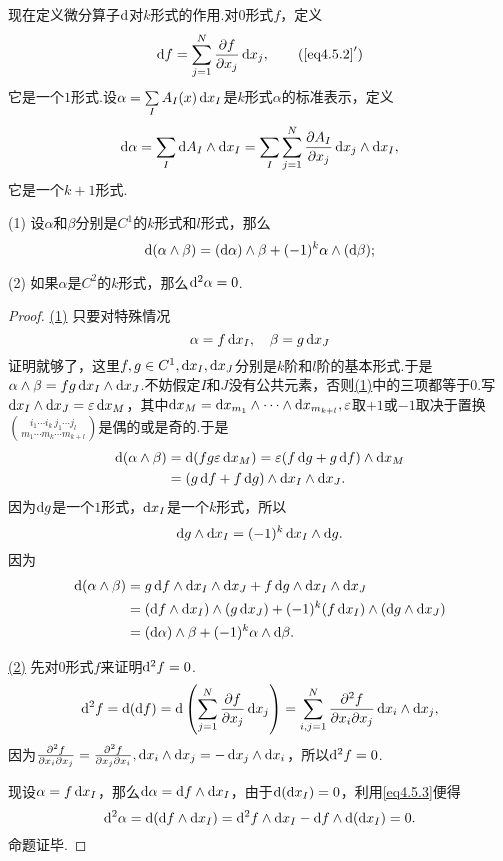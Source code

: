 现在定义微分算子$\mathop{}\!\mathrm{d}$对$k$形式的作用.对$0$形式$f$，定义
\begin{equation}\label{eq4.5.2'}
	\dif f=\sum_{j=1}^{N}\pp{f}{x_j}\dx_j,\tag{$\ref{eq4.5.2}'$}
\end{equation}
它是一个$1$形式.设$\alpha=\sum\limits_I A_I(x)\mathop{}\!\mathrm dx_I$是$k$形式$\alpha$的标准表示，定义
\[\mathop{}\!\mathrm{d}\alpha=\sum_I \mathop{}\!\mathrm{d} A_I\wedge\mathop{}\!\mathrm dx_I=\sum_I \sum_{j=1}^{N}\frac{\partial A_I}{\partial x_j}\mathop{}\!\mathrm dx_j\wedge\mathop{}\!\mathrm dx_I,\]
它是一个$k+1$形式.
\begin{prop}\label{prop4.5.1}
	(1)\hypertarget{4.5.1}{}
	设$\alpha$和$\beta$分别是$C^1$的$k$形式和$l$形式，那么
	\begin{equation}\label{eq4.5.3}
		\mathop{}\!\mathrm{d}(\alpha\wedge\beta)=(\mathop{}\!\mathrm{d}\alpha)\wedge\beta+(-1)^k\alpha\wedge(\mathop{}\!\mathrm{d}\beta);
	\end{equation}
	
	(2)\hypertarget{4.5.1}{}
	如果$\alpha$是$C^2$的$k$形式，那么$\mathop{}\!\mathrm{d}^2\alpha=0$.
\end{prop}
\begin{proof}
	\hyperlink{4.5.1}{(1)}
	只要对特殊情况
	\[\alpha=f\mathop{}\!\mathrm dx_I,\quad \beta=g\mathop{}\!\mathrm dx_J\]
	证明就够了，这里$f,g\in C^1,\mathop{}\!\mathrm dx_I,\mathop{}\!\mathrm dx_J$分别是$k$阶和$l$阶的基本形式.于是$\alpha\wedge\beta=fg\mathop{}\!\mathrm dx_I\wedge\mathop{}\!\mathrm dx_J$.不妨假定$I$和$J$没有公共元素，否则\hyperlink{4.5.1}{(1)}中的三项都等于$0$.写$\mathop{}\!\mathrm dx_I\wedge\mathop{}\!\mathrm dx_J=\varepsilon\mathop{}\!\mathrm dx_M$，其中$\mathop{}\!\mathrm dx_M=\mathop{}\!\mathrm dx_{m_1}\wedge\cdots\wedge\mathop{}\!\mathrm dx_{m_{k+l}},\varepsilon$取$+1$或$-1$取决于置换$\binom{i_1\cdots i_k\, j_1\cdots j_l}{m_1\cdots m_k\cdots m_{k+l}}$是偶的或是奇的.于是
	\begin{align*}
		\dif(\alpha\wedge\beta)
		&=\dif(fg\varepsilon\dx_M)=\varepsilon(f\dif g+g\dif f)\wedge\dx_M\\
		&=(g\dif f+f\dif g)\wedge\dx_I\wedge\dx_J.
	\end{align*}
因为$\mathop{}\!\mathrm{d} g$是一个$1$形式，$\mathop{}\!\mathrm dx_I$是一个$k$形式，所以
\[\mathop{}\!\mathrm{d} g\wedge\mathop{}\!\mathrm dx_I=(-1)^k \mathop{}\!\mathrm dx_I\wedge\mathop{}\!\mathrm{d} g.\]
因为
\begin{align*}
	\dif(\alpha\wedge\beta)
	&=g\dif f\wedge\dx_I\wedge\dx_J+f\dif g\wedge\dx_I\wedge\dx_J\\
	&=(\dif f\wedge\dx_I)\wedge(g\dx_J)+(-1)^k(f\dx_I)\wedge(\dif g\wedge\dx_J)\\
	&=(\dif\alpha)\wedge\beta+(-1)^k\alpha\wedge\dif\beta.
\end{align*}

\hyperlink{4.5.1}{(2)}
先对$0$形式$f$来证明$\mathop{}\!\mathrm{d}^2 f=0$.
\[\mathop{}\!\mathrm{d}^2 f=\mathop{}\!\mathrm{d}(\mathop{}\!\mathrm{d} f)=\mathop{}\!\mathrm{d}\left(\sum_{j=1}^{N}\frac{\partial f}{\partial x_j}\mathop{}\!\mathrm dx_j\right)=\sum_{i,j=1}^{N}\frac{\partial^2 f}{\partial x_i\partial x_j}\mathop{}\!\mathrm dx_i\wedge\mathop{}\!\mathrm dx_j,\]
因为$\frac{\partial^2 f}{\partial x_i\partial x_j}=\frac{\partial^2 f}{\partial x_j\partial x_i},\mathop{}\!\mathrm dx_i\wedge\mathop{}\!\mathrm dx_j=-\mathop{}\!\mathrm dx_j\wedge\mathop{}\!\mathrm dx_i$，所以$\mathop{}\!\mathrm{d}^2 f=0$.

现设$\alpha=f\mathop{}\!\mathrm dx_I$，那么$\mathop{}\!\mathrm{d}\alpha=\mathop{}\!\mathrm{d} f\wedge\mathop{}\!\mathrm dx_I$，由于$\mathop{}\!\mathrm{d}(\mathop{}\!\mathrm dx_I)=0$，利用\eqref{eq4.5.3}便得
\[\dif^2\alpha=\dif(\dif f\wedge\dx_I)=\dif^2 f\wedge\dx_I-\dif f\wedge\dif(\dx_I)=0.\]
命题证毕.
\end{proof}
